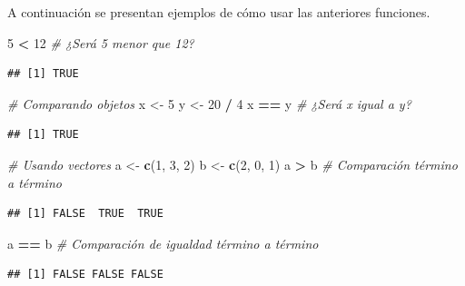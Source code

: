 \documentclass[10pt,]{krantz}
\makeatletter
\newenvironment{Shaded}{\begin{snugshade}}{\end{snugshade}}
\newcommand{\KeywordTok}[1]{\textcolor[rgb]{0.13,0.29,0.53}{\textbf{#1}}}
\newcommand{\DecValTok}[1]{\textcolor[rgb]{0.00,0.00,0.81}{#1}}
\newcommand{\StringTok}[1]{\textcolor[rgb]{0.31,0.60,0.02}{#1}}
\newcommand{\CommentTok}[1]{\textcolor[rgb]{0.56,0.35,0.01}{\textit{#1}}}
\newcommand{\OperatorTok}[1]{\textcolor[rgb]{0.81,0.36,0.00}{\textbf{#1}}}
\newcommand{\NormalTok}[1]{#1}
\newenvironment{kframe}{%
\medskip{}
\setlength{\fboxsep}{.8em}
 \def\at@end@of@kframe{}%
 \ifinner\ifhmode%
  \def\at@end@of@kframe{\end{minipage}}%
  \begin{minipage}{\columnwidth}%
 \fi\fi%
 \def\FrameCommand##1{\hskip\@totalleftmargin \hskip-\fboxsep
 \colorbox{shadecolor}{##1}\hskip-\fboxsep
     \hskip-\linewidth \hskip-\@totalleftmargin \hskip\columnwidth}%
 \MakeFramed {\advance\hsize-\width
   \@totalleftmargin\z@ \linewidth\hsize
   \@setminipage}}%
 {\par\unskip\endMakeFramed%
 \at@end@of@kframe}
\renewenvironment{Shaded}{\begin{kframe}}{\end{kframe}}
\makeatother
\begin{document}
A continuación se presentan ejemplos de cómo usar las anteriores
funciones.

\begin{Shaded}
\begin{Highlighting}[]
\DecValTok{5} \OperatorTok{<}\StringTok{ }\DecValTok{12}  \CommentTok{# ¿Será 5 menor que 12?}
\end{Highlighting}
\end{Shaded}

\begin{verbatim}
## [1] TRUE
\end{verbatim}

\begin{Shaded}
\begin{Highlighting}[]
\CommentTok{# Comparando objetos}
\NormalTok{x <-}\StringTok{ }\DecValTok{5}
\NormalTok{y <-}\StringTok{ }\DecValTok{20} \OperatorTok{/}\StringTok{ }\DecValTok{4}
\NormalTok{x }\OperatorTok{==}\StringTok{ }\NormalTok{y  }\CommentTok{# ¿Será x igual a y?}
\end{Highlighting}
\end{Shaded}

\begin{verbatim}
## [1] TRUE
\end{verbatim}

\begin{Shaded}
\begin{Highlighting}[]
\CommentTok{# Usando vectores}
\NormalTok{a <-}\StringTok{ }\KeywordTok{c}\NormalTok{(}\DecValTok{1}\NormalTok{, }\DecValTok{3}\NormalTok{, }\DecValTok{2}\NormalTok{)}
\NormalTok{b <-}\StringTok{ }\KeywordTok{c}\NormalTok{(}\DecValTok{2}\NormalTok{, }\DecValTok{0}\NormalTok{, }\DecValTok{1}\NormalTok{)}
\NormalTok{a }\OperatorTok{>}\StringTok{ }\NormalTok{b  }\CommentTok{# Comparación término a término}
\end{Highlighting}
\end{Shaded}

\begin{verbatim}
## [1] FALSE  TRUE  TRUE
\end{verbatim}

\begin{Shaded}
\begin{Highlighting}[]
\NormalTok{a }\OperatorTok{==}\StringTok{ }\NormalTok{b  }\CommentTok{# Comparación de igualdad término a término}
\end{Highlighting}
\end{Shaded}

\begin{verbatim}
## [1] FALSE FALSE FALSE
\end{verbatim}
\end{document}
